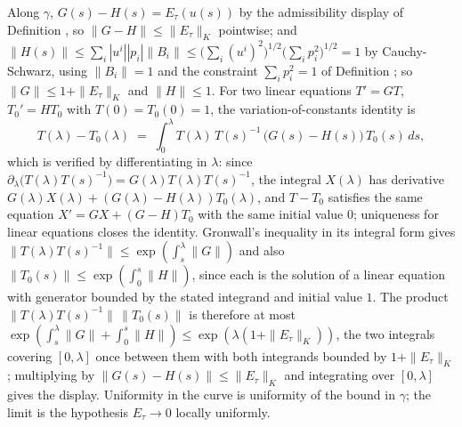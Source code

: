 Along $\gamma$, $G(s) - H(s) = E_{\tau}(u(s))$ by the admissibility display of Definition , so $\|G - H\| \le \|E_{\tau}\|_{K}$ pointwise; and $\|H(s)\| \le \sum_{i} |u^{i}| |p_{i}| \|B_{i}\| \le \bigl(\sum_i (u^{i})^{2}\bigr)^{1/2} \bigl(\sum_i p_{i}^{2}\bigr)^{1/2} = 1$ by Cauchy-Schwarz, using $\|B_i\| = 1$ and the constraint $\sum_i p_{i}^{2} = 1$ of Definition ; so $\|G\| \le 1 + \|E_{\tau}\|_{K}$ and $\|H\| \le 1$. For two linear equations $T' = GT$, $T_{0}' = HT_{0}$ with $T(0) = T_{0}(0) = 1$, the variation-of-constants identity is
\[
T(\lambda) - T_{0}(\lambda) \;=\; \int_{0}^{\lambda} T(\lambda)\,T(s)^{-1}\,\bigl(G(s) - H(s)\bigr)\,T_{0}(s)\,ds ,
\]
which is verified by differentiating in $\lambda$: since $\partial_{\lambda}\bigl(T(\lambda)T(s)^{-1}\bigr) = G(\lambda)T(\lambda)T(s)^{-1}$, the integral $X(\lambda)$ has derivative $G(\lambda)X(\lambda) + (G(\lambda) - H(\lambda))T_{0}(\lambda)$, and $T - T_{0}$ satisfies the same equation $X' = GX + (G - H)T_{0}$ with the same initial value $0$; uniqueness for linear equations closes the identity. Gronwall's inequality in its integral form gives $\|T(\lambda)T(s)^{-1}\| \le \exp(\int_{s}^{\lambda}\|G\|)$ and also $\|T_{0}(s)\| \le \exp(\int_{0}^{s}\|H\|)$, since each is the solution of a linear equation with generator bounded by the stated integrand and initial value $1$. The product $\|T(\lambda)T(s)^{-1}\|\,\|T_{0}(s)\|$ is therefore at most $\exp(\int_{s}^{\lambda}\|G\| + \int_{0}^{s}\|H\|) \le \exp(\lambda(1 + \|E_{\tau}\|_{K}))$, the two integrals covering $[0, \lambda]$ once between them with both integrands bounded by $1 + \|E_{\tau}\|_{K}$; multiplying by $\|G(s) - H(s)\| \le \|E_{\tau}\|_{K}$ and integrating over $[0, \lambda]$ gives the display. Uniformity in the curve is uniformity of the bound in $\gamma$; the limit is the hypothesis $E_{\tau} \to 0$ locally uniformly.
